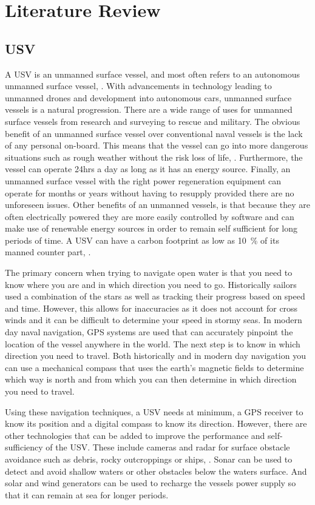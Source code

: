 \chapter{Literature Review}
\section{USV}
A USV is an unmanned surface vessel, and most often refers to an autonomous unmanned surface vessel, \cite{Patterson2022}. With advancements in technology leading to unmanned drones and development into autonomous cars, unmanned surface vessels is a natural progression. There are a wide range of uses for unmanned surface vessels from research and surveying to rescue and military. The obvious benefit of an unmanned surface vessel over conventional naval vessels is the lack of any personal on-board. This means that the vessel can go into more dangerous situations such as rough weather without the risk loss of life, \cite{Oceanalpha}. Furthermore, the vessel can operate 24hrs a day as long as it has an energy source. Finally, an unmanned surface vessel with the right power regeneration equipment can operate for months or years without having to resupply provided there are no unforeseen issues. Other benefits of an unmanned vessels, is that because they are often electrically powered they are more easily controlled by software and can make use of renewable energy sources in order to remain self sufficient for long periods of time. A USV can have a carbon footprint as low as \SI{10}{\percent} of its manned counter part, \cite{Fugro}.\par
The primary concern when trying to navigate open water is that you need to know where you are and in which direction you need to go. Historically sailors used a combination of the stars as well as tracking their progress based on speed and time. However, this allows for inaccuracies as it does not account for cross winds and it can be difficult to determine your speed in stormy seas. In modern day naval navigation, GPS systems are used that can accurately pinpoint the location of the vessel anywhere in the world. The next step is to know in which direction you need to travel. Both historically and in modern day navigation you can use a mechanical compass that uses the earth's magnetic fields to determine which way is north and from which you can then determine in which direction you need to travel. \par
Using these navigation techniques, a USV needs at minimum, a GPS receiver to know its position and a digital compass to know its direction. However, there are other technologies that can be added to improve the performance and self-sufficiency of the USV. These include cameras and radar for surface obstacle avoidance such as debris, rocky outcroppings or ships, \cite{Oceanalpha}. Sonar can be used to detect and avoid shallow waters or other obstacles below the waters surface. And solar and wind generators can be used to recharge the vessels power supply so that it can remain at sea for longer periods. 
